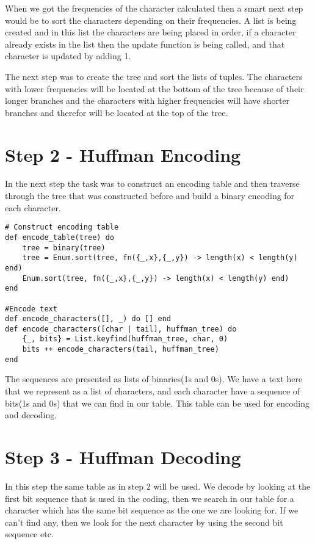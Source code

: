 \documentclass[a4paper,11pt]{article}
\begin{document}
When we got the frequencies of the character calculated then a smart next step would be to sort the characters depending on their frequencies. A list is being created and in this list the characters are being placed in order, if a character already exists in the list then the update function is being called, and that character is updated by adding 1.

The next step was to create the tree and sort the lists of tuples. The characters with lower frequencies will be located at the bottom of the tree because of their longer branches and the characters with higher frequencies will have shorter branches and therefor will be located at the top of the tree.

\section{Step 2 - Huffman Encoding}
In the next step the task was to construct an encoding table and then traverse through the tree that was constructed before and build a binary encoding for each character.

\begin{verbatim}
# Construct encoding table
def encode_table(tree) do
    tree = binary(tree)
    tree = Enum.sort(tree, fn({_,x},{_,y}) -> length(x) < length(y) end) 
    Enum.sort(tree, fn({_,x},{_,y}) -> length(x) < length(y) end)  
end

#Encode text
def encode_characters([], _) do [] end
def encode_characters([char | tail], huffman_tree) do
    {_, bits} = List.keyfind(huffman_tree, char, 0)
    bits ++ encode_characters(tail, huffman_tree)
end
\end{verbatim}

The sequences are presented as lists of binaries(1s and 0s). We have a text here that we represent as a list of characters, and each character have a sequence of bits(1s and 0s) that we can find in our table. This table can be used for encoding and decoding.

\section{Step 3 - Huffman Decoding}
In this step the same table as in step 2 will be used. We decode by looking at the first bit sequence that is used in the coding, then we search in our table for a character which has the same bit sequence as the one we are looking for. If we can't find any, then we look for the next character by using the second bit sequence etc.
\end{document}
